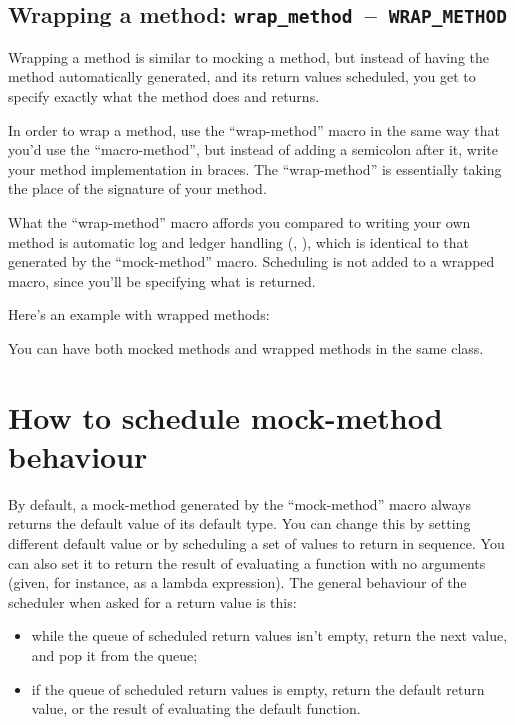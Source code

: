 \documentclass[twoside, a4paper, article]{memoir}
\newcommand*\testudocolor{\color{red!80!blue}}
\newcommand*\testudo[1]{\texttt{\testudocolor{}#1}}
\newcommand*\testudopair[2]{\testudo{#1}~--~\testudo{#2}}
\newcommand\subsectiontestudopair[3]{%
  \subsection[#1]{#1: \testudopair{#2}{#3}}}
\newcommand\typesetexample[1]{%
  \typesetexamplesource{#1}
}
\providecommand\typesetexamplesource[1]{%
}
\begin{document}
\typesetexample{mock-class-mock-method}


\subsectiontestudopair{Wrapping a method}{wrap\_method}{WRAP\_METHOD}
\label{sec:wrapping-method}

Wrapping a method is similar to mocking a method, but instead of having the
method automatically generated, and its return values scheduled, you get to
specify exactly what the method does and returns.

In order to wrap a method, use the ``wrap-method'' macro in the same way that
you'd use the ``macro-method'', but instead of adding a semicolon after it,
write your method implementation in braces.  The ``wrap-method'' is essentially
taking the place of the signature of your method.

What the ``wrap-method'' macro affords you compared to writing your own method
is automatic log and ledger handling (,
), which is identical to that generated by
the ``mock-method'' macro.  Scheduling is not added to a wrapped macro, since
you'll be specifying what is returned.

Here's an example with wrapped methods:

\typesetexample{mock-class-wrap-method}

You can have both mocked methods and wrapped methods in the same class.


\section{How to schedule mock-method behaviour}
\label{sec:schedule-mock-method}

By default, a mock-method generated by the ``mock-method'' macro always returns
the default value of its default type.  You can change this by setting
different default value or by scheduling a set of values to return in sequence.
You can also set it to return the result of evaluating a function with no
arguments (given, for instance, as a lambda expression).  The general behaviour
of the scheduler when asked for a return value is this:
\begin{itemize}
\item while the queue of scheduled return values isn't empty, return the next
  value, and pop it from the queue;
\item if the queue of scheduled return values is empty, return the default
  return value, or the result of evaluating the default function.
\end{itemize}
\end{document}
